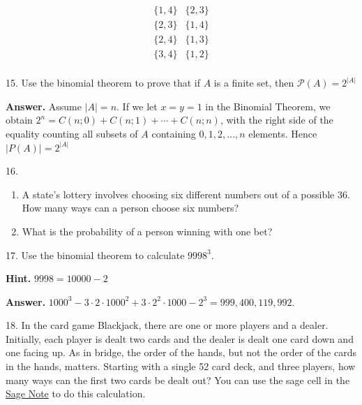 \documentclass[10pt,]{book}
\theoremstyle{plain}
\theoremstyle{definition}
\theoremstyle{definition}
\theoremstyle{definition}
\begin{document}
\begin{exercisegroup}
\begin{equation*}
\begin{array}{cc}
 \{1,4\} & \{2,3\} \\
 \{2,3\} & \{1,4\} \\
 \{2,4\} & \{1,3\} \\
 \{3,4\} & \{1,2\} \\
\end{array}
\end{equation*} %
\par\smallskip
\item[15.]\hypertarget{exercise-57}{} Use the binomial theorem to prove that if \(A\) is a finite set, then 
\(\mathscr{P}(A) = 2^{\lvert A \rvert}\)%
\par\smallskip
\par\smallskip
\noindent\textbf{Answer.}\hypertarget{answer-29}{}\quad
 Assume \(\lvert A \rvert =n.\) If we let \(x=y=1\) in the Binomial Theorem, we obtain \(2^n=C(n;0)+C(n;1)+\cdots +C(n;n)\), with the right side of the equality counting all subsets of \(A\) containing \(0, 1, 2, \dots , n\) elements.  Hence \(\left| P(A)\right| =2^{\left| A\right| }\) %
\item[16.]\hypertarget{exercise-58}{}\leavevmode%
\begin{enumerate}[label=\alph*]
\item\hypertarget{li-71}{}A state's lottery involves choosing six different numbers out of a possible 36. How many ways can a person choose six numbers?%
\item\hypertarget{li-72}{}What is the probability of a person winning with one bet?%
\end{enumerate}
%
\par\smallskip
\item[17.]\hypertarget{exercise-59}{}Use the binomial theorem to calculate \(9998^3\).%
\par\smallskip
\par\smallskip
\noindent\textbf{Hint.}\hypertarget{hint-2}{}\quad
\(9998 = 10000-2\)%
\par\smallskip
\noindent\textbf{Answer.}\hypertarget{answer-30}{}\quad
 \(1000^3 - 3\cdot 2 \cdot 1000^2 +3 \cdot 2^2 \cdot 1000 -2^3 = 999,400,119,992.\)%
\item[18.]\hypertarget{exercise-60}{} In the card game Blackjack, there are one or more players and a dealer.  Initially, each player is dealt two cards and the dealer is dealt one card down and one facing up.  As in bridge, the order of the hands, but not the order of the cards in the hands, matters.  Starting with a single 52 card deck, and three players, how many ways can the first two cards be dealt out?  You can use the sage cell in the \hyperref[sage-bridge-hands]{Sage Note} to do this calculation. %
\par\smallskip
\end{exercisegroup}
\par\smallskip\noindent
%
\backmatter
%
%
%
\typeout{************************************************}
\typeout{************************************************}
\end{document}
